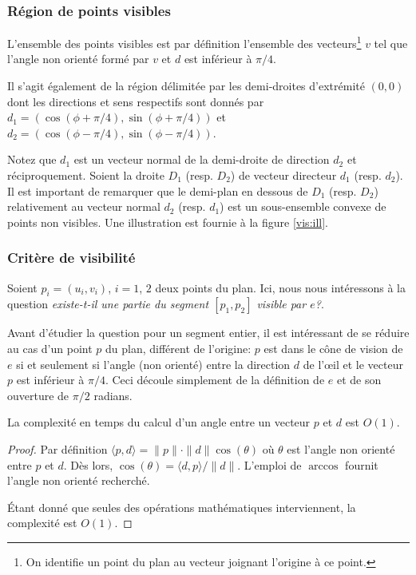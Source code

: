 \subsubsection{Région de points visibles}
L'ensemble des points visibles est par définition l'ensemble
des vecteurs\footnote{On identifie un point du plan au vecteur
  joignant l'origine à ce point.} $v$ tel que l'angle non orienté formé
par $v$ et $d$ est inférieur à $\pi/4$.

Il s'agit également de la région délimitée par les demi-droites d'extrémité
$(0, 0)$ dont les directions et sens respectifs sont donnés par
$d_1 = (\cos(\phi + \pi/4), \sin(\phi + \pi/4))$ et
$d_2 = (\cos(\phi - \pi/4), \sin(\phi - \pi/4))$.

Notez que $d_1$ est un vecteur
normal de la demi-droite de direction $d_2$ et réciproquement.
Soient la droite $D_1$ (resp. $D_2$) de vecteur directeur $d_1$
(resp. $d_2$). Il est important de remarquer
que le demi-plan en dessous de $D_1$ (resp. $D_2$) relativement au vecteur
normal $d_2$ (resp. $d_1$) est un sous-ensemble convexe de points non visibles.
Une illustration est fournie à la figure \ref{vis:ill}.


\subsubsection{Critère de visibilité}
Soient $p_i=(u_i, v_i)$, $i = 1$, $2$ deux points du plan. Ici, nous nous
intéressons à la question \og\emph{existe-t-il une partie du segment $[p_1, p_2]$
  visible par $e$?}\fg.

Avant d'étudier la question pour un segment entier, il est intéressant de
se réduire au cas d'un point $p$ du plan, différent de l'origine:
$p$ est dans le cône de vision de $e$
si et seulement si l'angle (non orienté) entre la direction
$d$ de l'\oe{}il et le vecteur $p$
est inférieur
à $\pi/4$. Ceci découle simplement de la définition de $e$ et de son ouverture
de $\pi/2$ radians.

\begin{lem}
  La complexité en temps du calcul d'un angle entre un vecteur $p$ et $d$ est
  $O(1)$.
\end{lem}
\begin{proof}
  Par définition $\langle p, d\rangle = \|p\|\cdot \|d\| \cos(\theta)$ où $\theta$ est
  l'angle non orienté entre $p$ et $d$. Dès lors,
  $\cos(\theta) = \langle d, p\rangle/\|d\|$. L'emploi de $\arccos$ fournit
  l'angle non orienté recherché.

  \'Etant donné que seules des opérations mathématiques interviennent,
  la complexité est $O(1)$.
\end{proof}

